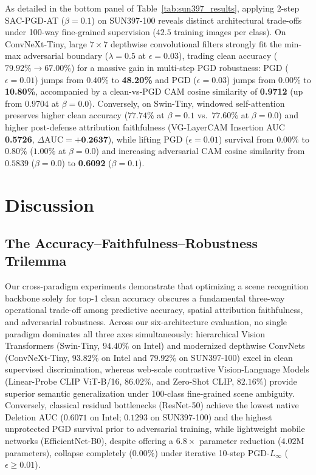 \documentclass[final,5p,times,twocolumn]{elsarticle}
\begin{document}
As detailed in the bottom panel of Table~\ref{tab:sun397_results}, applying 2-step SAC-PGD-AT ($\beta=0.1$) on SUN397-100 reveals distinct architectural trade-offs under 100-way fine-grained supervision ($42.5$ training images per class). On ConvNeXt-Tiny, large $7\times7$ depthwise convolutional filters strongly fit the min-max adversarial boundary ($\lambda=0.5$ at $\epsilon=0.03$), trading clean accuracy ($79.92\% \to 67.00\%$) for a massive gain in multi-step PGD robustness: PGD ($\epsilon=0.01$) jumps from $0.40\%$ to \textbf{48.20\%} and PGD ($\epsilon=0.03$) jumps from $0.00\%$ to \textbf{10.80\%}, accompanied by a clean-vs-PGD CAM cosine similarity of \textbf{0.9712} (up from $0.9704$ at $\beta=0.0$). Conversely, on Swin-Tiny, windowed self-attention preserves higher clean accuracy ($77.74\%$ at $\beta=0.1$ vs.\ $77.60\%$ at $\beta=0.0$) and higher post-defense attribution faithfulness (VG-LayerCAM Insertion AUC \textbf{0.5726}, $\Delta\text{AUC} = \textbf{+0.2637}$), while lifting PGD ($\epsilon=0.01$) survival from $0.00\%$ to $0.80\%$ ($1.00\%$ at $\beta=0.0$) and increasing adversarial CAM cosine similarity from $0.5839$ ($\beta=0.0$) to \textbf{0.6092} ($\beta=0.1$).

\section{Discussion}
\label{sec:discussion}

\subsection{The Accuracy--Faithfulness--Robustness Trilemma}
Our cross-paradigm experiments demonstrate that optimizing a scene recognition backbone solely for top-1 clean accuracy obscures a fundamental three-way operational trade-off among predictive accuracy, spatial attribution faithfulness, and adversarial robustness. Across our six-architecture evaluation, no single paradigm dominates all three axes simultaneously: hierarchical Vision Transformers (Swin-Tiny, $94.40\%$ on Intel) and modernized depthwise ConvNets (ConvNeXt-Tiny, $93.82\%$ on Intel and $79.92\%$ on SUN397-100) excel in clean supervised discrimination, whereas web-scale contrastive Vision-Language Models (Linear-Probe CLIP ViT-B/16, $86.02\%$, and Zero-Shot CLIP, $82.16\%$) provide superior semantic generalization under 100-class fine-grained scene ambiguity. Conversely, classical residual bottlenecks (ResNet-50) achieve the lowest native Deletion AUC ($0.6071$ on Intel; $0.1293$ on SUN397-100) and the highest unprotected PGD survival prior to adversarial training, while lightweight mobile networks (EfficientNet-B0), despite offering a $6.8\times$ parameter reduction ($4.02$M parameters), collapse completely ($0.00\%$) under iterative 10-step $\text{PGD-}L_\infty$ ($\epsilon \ge 0.01$).
\end{document}
